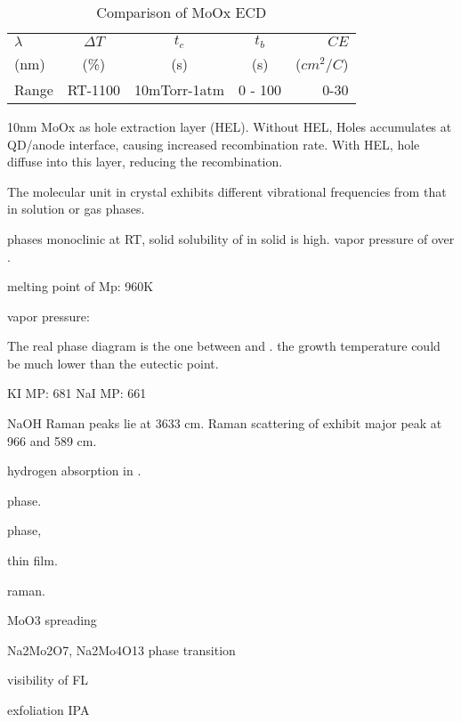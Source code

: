 \begin{table}[htb]
\centering
\caption{Comparison of MoOx ECD}\label{tab:moxecd}
\begin{tabular}{lcccr}
\toprule
$\lambda$ & $\Delta T$ & $t_c$ & $t_b$ & $CE$  \\
         (nm) & (\%)    & (s) & (s) & ($cm^2/C$)  \\
\midrule
Range      & RT-1100    & 10mTorr-1atm & 0 - 100 & 0-30  \\
\bottomrule
\end{tabular}
\end{table}


10nm MoOx as hole extraction layer (HEL). Without HEL, Holes accumulates at QD/anode interface, causing increased recombination rate. With HEL, hole diffuse into this layer, reducing the recombination. 

The molecular unit in crystal exhibits different vibrational frequencies from that in solution or gas phases.

 phases monoclinic at RT, solid solubility of  in solid  is high. vapor pressure of  over .

melting point of 
Mp:  960K

 vapor pressure:

The real phase diagram is the one between  and .
the growth temperature could be much lower than the eutectic point.

KI MP:  681
NaI MP: 661

NaOH Raman peaks lie at 3633 cm. \cite{walrafen2006} Raman scattering of  exhibit major peak at 966 and 589 cm.\cite{Richet1996}

hydrogen absorption in .\cite{Sha2009}

 phase. \cite{Bramnik2004}

 phase, \cite{Gatehouse1983}

 thin film. \cite{Carcia1987}

 raman.\cite{Hirata1996}

MoO3 spreading \cite{Leyrer1990}

Na2Mo2O7, Na2Mo4O13 phase transition \cite{SinghMudher2005}\cite{Tangri1992}

visibility of FL \cite{Benameur2011}

exfoliation IPA \cite{Halim2013}  \cite{Zhou2011a}

